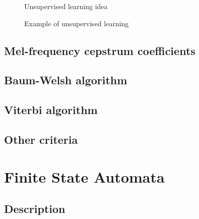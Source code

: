 \begin{figure}
    \begin{center}
    
    \caption{Unsupervised learning idea}
    \label{fig:unsupervised-gen} 
    \end{center}
\end{figure}

\begin{figure}
    \begin{center}
    
    \caption{Example of unsupervised learning}
    \label{fig:unsupervised-lm} 
    \end{center}
\end{figure}

\subsection[MFCC coefficients]{Mel-frequency cepstrum coefficients}
\label{sub:mel_frequency_cepstrum_coefficients}



\subsection{Baum-Welsh algorithm}
\label{sub:baum_welsh_algorithm}




\subsection{Viterbi algorithm}
\label{sub:viterbi_algorithm}


\subsection{Other criteria}
\label{sub:other_criteria}





\section{Finite State Automata} 
\label{sec:finite_state_automata}

\subsection{Description}
\label{sub:description}

